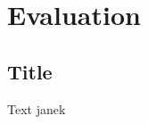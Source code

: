 
\chapter{Evaluation}  %

\ifpdf
    \graphicspath{{Chapters/Chapter4/Figs/Raster/}{Chapters/Chapter4/Figs/PDF/}{Chapters/Chapter4/Figs/}}
\else
    \graphicspath{{Chapters/Chapter4/Figs/Vector/}{Chapters/Chapter4/Figs/}}
\fi


\section{Title}
Text janek